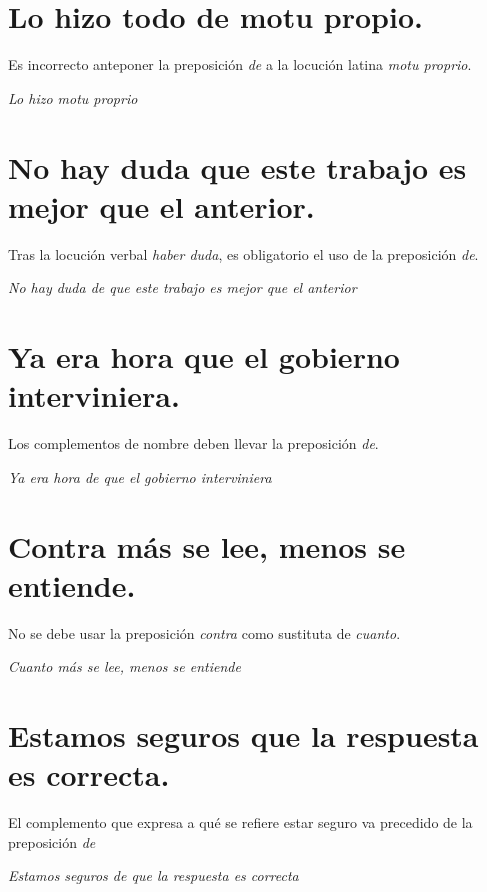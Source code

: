 \documentclass[12pt, a4paper, oneside]{report}
\begin{document}
        \section{Lo hizo todo \color{rojo}de motu propio\color{negro}.}
        Es incorrecto anteponer la preposición \emph{de} a la locución latina \emph{motu proprio}.
        \begin{center}
            \textit{Lo hizo \color{verde}motu proprio\color{negro}}
        \end{center}

        \section{No hay duda \color{rojo}que\color{negro} \;este trabajo es mejor que el anterior.}
        Tras la locución verbal \emph{haber duda}, es obligatorio el uso de la preposición \emph{de}.
        \begin{center}
            \textit{No hay duda \color{verde}de que\color{negro} \;este trabajo es mejor que el anterior}
        \end{center}

        \section{Ya era hora \color{rojo}que\color{negro} \;el gobierno interviniera.}
        Los complementos de nombre deben llevar la preposición \emph{de}.
        \begin{center}
            \textit{Ya era hora \color{verde}de que\color{negro} \;el gobierno interviniera}
        \end{center}

        \section{\color{rojo}Contra\color{negro} \;más se lee, menos se entiende.}
        No se debe usar la preposición \emph{contra} como sustituta de \emph{cuanto}.
        \begin{center}
            \textit{\color{verde}Cuanto\color{negro} \;más se lee, menos se entiende}
        \end{center}
        \clearpage

        \setcounter{chapter}{3}
        \setcounter{section}{0}

        \section{Estamos seguros \color{rojo}que\color{negro} \;la respuesta es correcta.}
        El complemento que expresa a qué se refiere estar seguro va precedido de la preposición \emph{de}
        \begin{center}
            \textit{Estamos seguros \color{verde}de que\color{negro} \;la respuesta es correcta}
        \end{center}
\end{document}
